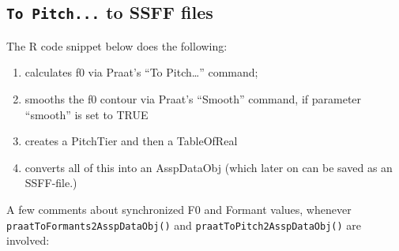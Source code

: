 \documentclass[]{book}
\providecommand{\tightlist}{%
  \setlength{\itemsep}{0pt}\setlength{\parskip}{0pt}}
\begin{document}
\hypertarget{to-pitch...-to-ssff-files}{%
\subsection{\texorpdfstring{\texttt{To\ Pitch...} to SSFF files}{To Pitch... to SSFF files}}\label{to-pitch...-to-ssff-files}}

The R code snippet below does the following:

\begin{enumerate}
\def\labelenumi{\alph{enumi})}
\tightlist
\item
  calculates f0 via Praat's ``To Pitch\ldots{}'' command;
\item
  smooths the f0 contour via Praat's ``Smooth'' command, if parameter ``smooth'' is set to TRUE
\item
  creates a PitchTier and then a TableOfReal
\item
  converts all of this into an AsspDataObj (which later on can be saved as an SSFF-file.)
\end{enumerate}

A few comments about synchronized F0 and Formant values, whenever \texttt{praatToFormants2AsspDataObj()} and
\texttt{praatToPitch2AsspDataObj()} are involved:
\end{document}
